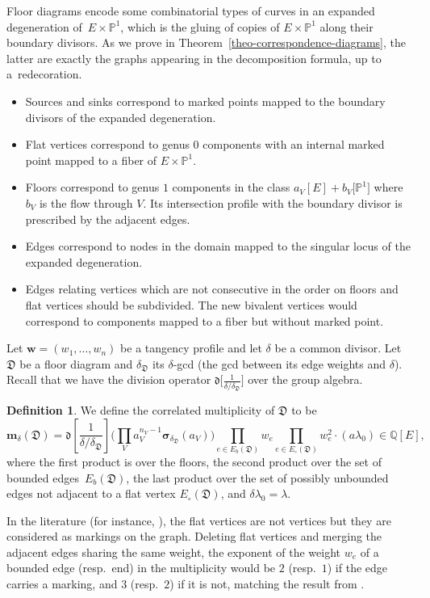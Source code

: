 \documentclass[pdftex]{sigma}
\renewcommand{\d}[1]{\dfk\left[ #1 \right]}
\newcommand{\PP}{\mathbb{P}}
\newcommand{\QQ}{\mathbb{Q}}
\newcommand{\bfw}{ {\boldsymbol w} }
\newcommand{\bfm}{ {\boldsymbol m} }
\newcommand{\Dfk}{\mathfrak{D}}
\newcommand{\dfk}{\mathfrak{d}}
\numberwithin{equation}{section}
\theoremstyle{definition}
\newtheorem{defi}[theo]{Definition}
\begin{document}
Floor diagrams encode some combinatorial types of curves in an expanded degeneration of~${E\times\PP^1}$, which is the gluing of copies of $E\times\PP^1$ along their boundary divisors. As we prove in Theorem~\ref{theo-correspondence-diagrams}, the latter are exactly the graphs appearing in the decomposition formula, up to a~redecoration.
 \begin{itemize}\itemsep=0pt
 \item Sources and sinks correspond to marked points mapped to the boundary divisors of the expanded degeneration.
 \item Flat vertices correspond to genus $0$ components with an internal marked point mapped to a fiber of $E\times\PP^1$.
 \item Floors correspond to genus $1$ components in the class $a_V[E]+b_V\big[\PP^1\big]$ where $b_V$ is the flow through $V$. Its intersection profile with the boundary divisor is prescribed by the adjacent edges.
 \item Edges correspond to nodes in the domain mapped to the singular locus of the expanded degeneration.
 \item Edges relating vertices which are not consecutive in the order on floors and flat vertices should be subdivided. The new bivalent vertices would correspond to components mapped to a fiber but without marked point.
 \end{itemize}


Let $\bfw=(w_1,\dots,w_n)$ be a tangency profile and let $\delta$ be a common divisor. Let $\Dfk$ be a floor diagram and $\delta_\Dfk$ its $\delta$-gcd (the gcd between its edge weights and $\delta$). Recall that we have the division operator $\dfk\big[\frac{1}{\delta/\delta_\Dfk}\big]$ over the group algebra.

\begin{defi}\label{defi-multiplicity-diagram}
 We define the correlated multiplicity of $\Dfk$ to be
 \[ \bfm_\delta(\Dfk) = \d{\frac{1}{\delta/\delta_\Dfk}}\biggl(\prod_V a_V^{n_V-1}\boldsymbol{\sigma}_{\delta_\Dfk}(a_V) \biggr) \prod_{e\in E_b(\Dfk)} w_e\prod_{e\in E_\circ(\Dfk)}w_e^2 \cdot (a\lambda_0) \in \QQ[E], \]
 where the first product is over the floors, the second product over the set of bounded edges~$E_b(\Dfk)$, the last product over the set of possibly unbounded edges not adjacent to a flat vertex $E_\circ(\Dfk)$, and $\delta\lambda_0=\lambda$.
\end{defi}

In the literature (for instance, \cite{blomme2022floor,brugalle2008floor}), the flat vertices are not vertices but they are considered as markings on the graph. Deleting flat vertices and merging the adjacent edges sharing the same weight, the exponent of the weight $w_e$ of a bounded edge (resp.\ end) in the multiplicity would be $2$ (resp.\ $1$) if the edge carries a marking, and $3$ (resp.\ $2$) if it is not, matching the result from \cite{blomme2022floor}.
\end{document}
